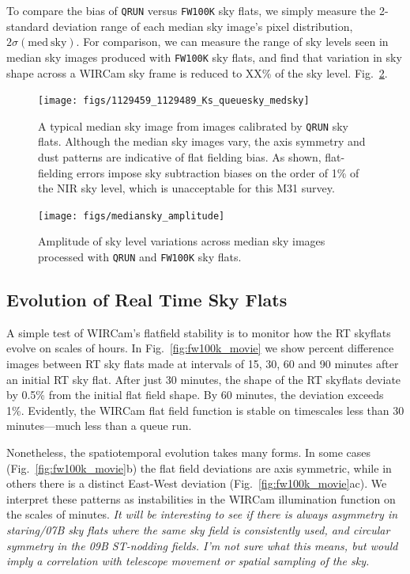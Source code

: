 \documentclass[iop]{emulateapj}
\newcommand{\comment}[1]{\textcolor{OliveGreen}{\textit{#1}}} %
\newcommand{\Fig}[1]{Fig.~\ref{fig:#1}}  %
\begin{document}
To compare the bias of \texttt{QRUN} versus \texttt{FW100K} sky flats, we simply measure the 2-standard deviation range of each median sky image's pixel distribution, $2 \sigma(\mathrm{med~sky})$.
For comparison, we can measure the range of sky levels seen in median sky images produced with \texttt{FW100K} sky flats, and find that variation in sky shape across a WIRCam sky frame is reduced to XX\% of the sky level. \Fig{mediansky_amplitude}.

\begin{figure}[t]
\centering
\texttt{[image: figs/1129459\_1129489\_Ks\_queuesky\_medsky]}
\caption{A typical median sky image from images calibrated by \texttt{QRUN} sky flats.
Although the median sky images vary,  the axis symmetry and dust patterns are indicative of flat fielding bias.
As shown, flat-fielding errors impose sky subtraction biases on the order of 1\% of the NIR sky level, which is unacceptable for this M31 survey.}
\label{fig:qrun_median_sky}
\end{figure}

\begin{figure}[t]
\centering
\texttt{[image: figs/mediansky\_amplitude]}
\caption{Amplitude of sky level variations across median sky images processed with \texttt{QRUN} and \texttt{FW100K} sky flats.}
\label{fig:mediansky_amplitude}
\end{figure}

\subsection{Evolution of Real Time Sky Flats} %
\label{sec:flatevo}

A simple test of WIRCam's flatfield stability is to monitor how the RT skyflats evolve on scales of hours.
In \Fig{fw100k_movie} we show percent difference images between RT sky flats made at intervals of 15, 30, 60 and 90 minutes after an initial RT sky flat.
After just 30 minutes, the shape of the RT skyflats deviate by 0.5\% from the initial flat field shape.
By 60 minutes, the deviation exceeds 1\%.
Evidently, the WIRCam flat field function is stable on timescales less than 30 minutes---much less than a queue run.

Nonetheless, the spatiotemporal evolution takes many forms.
In some cases (\Fig{fw100k_movie}b) the flat field deviations are axis symmetric, while in others there is a distinct East-West deviation (\Fig{fw100k_movie}ac).
We interpret these patterns as instabilities in the WIRCam illumination function on the scales of minutes.
\comment{It will be interesting to see if there is always asymmetry in staring/07B sky flats where the same sky field is consistently used, and circular symmetry in the 09B ST-nodding fields. I'm not sure what this means, but would imply a correlation with telescope movement or spatial sampling of the sky.}
\end{document}
